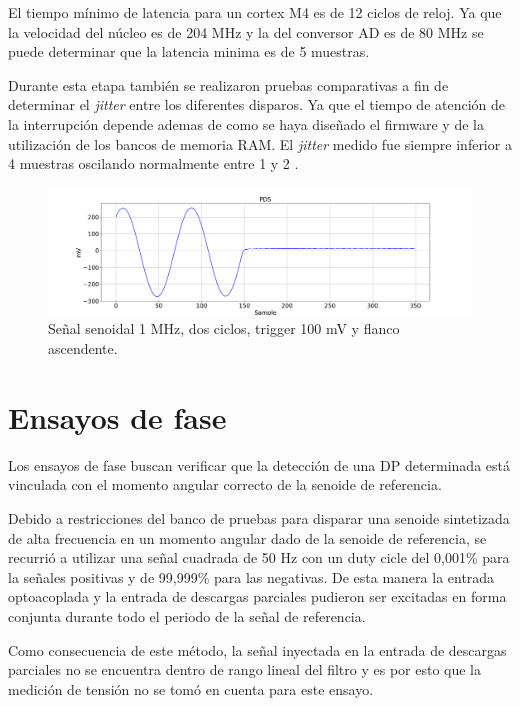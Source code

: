 El tiempo mínimo de latencia para un cortex M4 es de 12 ciclos de reloj. Ya que la velocidad del núcleo es de 204 MHz y la del conversor AD es de 80 MHz se puede determinar que la latencia minima es de 5 muestras. 

Durante esta etapa también se realizaron pruebas comparativas a fin de determinar el \textit{jitter} entre los diferentes disparos. Ya que el tiempo de atención de la interrupción depende ademas de como se haya diseñado el firmware y de la utilización de los bancos de memoria RAM. El \textit{jitter} medido fue siempre inferior a 4 muestras oscilando normalmente entre 1 y 2 .

\vspace{5mm}

\begin{figure}[htpb]
	\hspace{-1.2cm}
	\includegraphics[width=165mm]{./Figures/tiempoInicial.png}
	\caption{Señal senoidal 1 MHz, dos ciclos, trigger 100 mV y flanco ascendente.}
	\label{fig:tiempoInicial}
\end{figure}


\section{Ensayos de fase}

Los ensayos de fase buscan verificar que la detección de una DP determinada está vinculada con el momento angular correcto de la senoide de referencia.

Debido a restricciones del banco de pruebas para disparar una senoide sintetizada de alta frecuencia en un momento angular dado de la senoide de referencia, se recurrió a utilizar una señal cuadrada de 50 Hz con un duty cicle del 0,001\% para la señales positivas y de 99,999\% para las negativas. De esta manera la entrada optoacoplada y la entrada de descargas parciales pudieron ser excitadas en forma conjunta durante todo el periodo de la señal de referencia.

Como consecuencia de este método, la señal inyectada en la entrada de descargas parciales no se encuentra dentro de rango lineal del filtro y es por esto que la medición de tensión no se tomó en cuenta para este ensayo.

